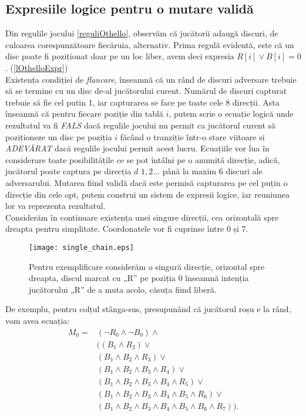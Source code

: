 \documentclass[12pt,twoside,a4paper,fleqn]{book}
\theoremstyle{definition}
\begin{document}
\subsection{Expresiile logice pentru o mutare validă}
\label{expr_logice_section}
Din regulile jocului \ref{reguliOthello}, observăm că jucătorii adaugă discuri, de culoarea corespunzătoare fiecăruia, alternativ. Prima regulă evidentă, este că un disc poate fi poziționat doar pe un loc liber, avem deci expresia $R[i] \lor B[i] =  0$. (\ref{lOthelloExpr})\\
Existența condiției de \emph{flancare}, înseamnă că un rând de discuri adversare trebuie să se termine cu un disc de-al jucătorului curent. Numărul de discuri capturat trebuie să fie cel putin 1\label{flanc_it}, iar capturarea se face pe toate cele 8 direcții. Asta înseamnă că pentru fiecare poziție din tablă $i$, putem scrie o ecuație logică unde rezultatul va fi \emph{FALS} dacă regulile jocului nu permit ca jucătorul curent să poziționeze un disc pe poziția $i$ făcând o tranziție într-o stare viitoare si \emph{ADEVĂRAT} dacă regulile jocului permit acest lucru. Ecuațiile vor lua în considerare toate posibilitățile ce se pot întâlni pe o anumită direcție, adică, jucătorul poate captura pe direcția $d$ $1, 2 \ldots$ până la maxim 6 discuri ale adversarului. Mutarea fiind validă dacă este permisă capturarea pe cel puțin o direcție din cele opt, putem construi un sistem de expresii logice, iar reuniunea lor va reprezenta rezultatul.\\
Considerăm în continuare existența unei singure direcții, cea orizontală spre dreapta pentru simplitate. Coordonatele vor fi cuprinse între $0$ și $7$.
\begin{figure}
\texttt{[image: single\_chain.eps]}
\caption{\small{Pentru exemplificare considerăm o singură direcție, orizontal spre dreapta, discul marcat cu „R” pe poziția 0 înseamnă intenția jucătorului „R” de a muta acolo, căsuța fiind liberă.}}
\label{fig:fig_move_chain}
\end{figure}
De exemplu, pentru colțul stânga-sus, presupunând că jucătorul roșu e la rând, vom avea ecuația:
\begin{align}
\label{move_eq}
M_{0} =& (\lnot R_{0} \land \lnot B_{0}) \land\\
    &\big((B_{1} \land R_{2}) \lor\\
    &(B_{1} \land B_{2} \land R_{3}) \lor\\ 
    &(B_{1} \land B_{2} \land B_{3} \land R_{4}) \lor\\ 
    &(B_{1} \land B_{2} \land B_{3} \land B_{4} \land R_{5}) \lor\\ 
    &(B_{1} \land B_{2} \land B_{3} \land B_{4} \land B_{5} \land R_{6}) \lor\\ 
    &(B_{1} \land B_{2} \land B_{3} \land B_{4} \land B_{5} \land B_{6} \land R_{7})\big).
\end{align}
\end{document}

